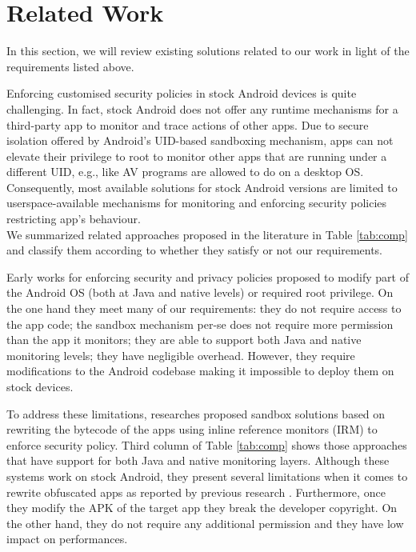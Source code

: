 \section{Related Work}
\label{sec:related}

In this section, we will review existing solutions related to our work in light of the requirements listed above. 

Enforcing customised security policies in stock Android devices is quite challenging. In fact, stock Android does not offer any runtime mechanisms for a third-party app to monitor and trace actions of other apps. Due to secure isolation offered by Android's UID-based sandboxing mechanism, apps can not elevate their privilege to root to monitor other apps that are running under a different UID, e.g., like AV programs are allowed to do on a desktop OS. Consequently, most available solutions for stock Android versions are limited to userspace-available mechanisms for monitoring and enforcing security policies restricting app's behaviour. \\
We summarized related approaches proposed in the literature in Table \ref{tab:comp} and classify them according to whether they satisfy or not our requirements. 

Early works for enforcing security and privacy  policies  \cite{wang2015deepdroid,conti2010crepe,enck2014taintdroid,russello2013firedroid,heuser2014asm,bugiel2011practical} proposed to modify part of the Android OS (both at Java and native levels) or required root privilege. On the one hand they meet many of our requirements: they do not require access to the app code; the sandbox mechanism per-se does not require more permission than the app it monitors; they are able to support both Java and native monitoring levels; they have negligible overhead.
However,  they require modifications to the Android codebase making it impossible to deploy them on stock devices. 

To address these limitations, researches proposed sandbox solutions based on rewriting the bytecode of the apps using inline reference monitors (IRM) to enforce security policy. Third column of Table \ref{tab:comp} shows those approaches \cite{xu2012aurasium,you2016reference,zhou2015hybrid} that have support for both Java and native monitoring layers.
Although these systems work on stock Android, they present several limitations when it comes to rewrite obfuscated apps  as reported by previous research \cite{hao2013effectiveness}. Furthermore, once they modify the APK of the target app they break the developer copyright. On the other hand, they do not require any additional permission and they have low impact on performances.



